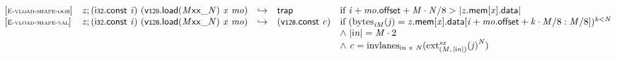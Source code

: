 \vspace{1ex}

$$
\begin{array}{@{}l@{}lcl@{}l@{}}
{[\textsc{\scriptsize E{-}vload{-}shape{-}oob}]} \quad & {\mathit{z}} ; (\mathsf{i{\scriptstyle32}}.\mathsf{const}~{\mathit{i}})~({\mathsf{v{\scriptstyle128}.load}}{({{{{{\mathit{M}}}{\mathsf{x}}}{\mathsf{x}}}{\mathsf{\_}}}{{\mathit{N}}})}~{\mathit{x}}~{\mathit{mo}}) &\hookrightarrow& \mathsf{trap} &\quad
  \mbox{if}~{\mathit{i}} + {\mathit{mo}}.\mathsf{offset} + {\mathit{M}} \cdot {\mathit{N}} / 8 > {|{{\mathit{z}}.\mathsf{mem}}{[{\mathit{x}}]}.\mathsf{data}|} \\
{[\textsc{\scriptsize E{-}vload{-}shape{-}val}]} \quad & {\mathit{z}} ; (\mathsf{i{\scriptstyle32}}.\mathsf{const}~{\mathit{i}})~({\mathsf{v{\scriptstyle128}.load}}{({{{{{\mathit{M}}}{\mathsf{x}}}{\mathsf{x}}}{\mathsf{\_}}}{{\mathit{N}}})}~{\mathit{x}}~{\mathit{mo}}) &\hookrightarrow& (\mathsf{v{\scriptstyle128}}.\mathsf{const}~{\mathit{c}}) &\quad
  \mbox{if}~({{\mathrm{bytes}}}_{{{\mathit{i}}}{{\mathit{M}}}}({\mathit{j}}) = {{\mathit{z}}.\mathsf{mem}}{[{\mathit{x}}]}.\mathsf{data}[{\mathit{i}} + {\mathit{mo}}.\mathsf{offset} + {\mathit{k}} \cdot {\mathit{M}} / 8 : {\mathit{M}} / 8])^{{\mathit{k}}<{\mathit{N}}} \\
 &&&&\quad {\land}~{|{\mathsf{i}}{{\mathit{n}}}|} = {\mathit{M}} \cdot 2 \\
 &&&&\quad {\land}~{\mathit{c}} = {{\mathrm{invlanes}}}_{{\mathsf{i}}{{\mathit{n}}}~\mathsf{x}~{\mathit{N}}}({{{{{\mathrm{ext}}}_{({\mathit{M}},\, {|{\mathsf{i}}{{\mathit{n}}}|})}^{{\mathit{sx}}}}}{({\mathit{j}})}^{{\mathit{N}}}}) \\
\end{array}
$$

\vspace{1ex}

